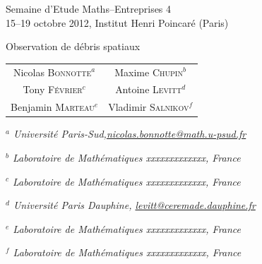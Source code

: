 \documentclass[a4paper,11pt]{article}
\numberwithin{section}{part}
\begin{document}
 \setcounter{page}{0}
 \thispagestyle{empty}
\begin{center}
\sffamily
 {\LARGE \sc Semaine d'Etude Maths--Entreprises 4} \\
\vfill
 {\large  15--19 octobre 2012, Institut Henri Poincaré (Paris)}
\end{center}
\vfill
\begin{center}
 \LARGE \textsf{Observation de débris spatiaux}
\end{center}
\vspace*{0.5cm}
\begin{center}
 \large \sffamily
\begin{tabular}{cc}
         Nicolas \textsc{Bonnotte$^{a}$} & Maxime \textsc{Chupin$^{b}$} \\
         Tony \textsc{Février$^{c}$} & Antoine \textsc{Levitt$^{d}$} \\ 
         Benjamin \textsc{Marteau$^{e}$} & Vladimir \textsc{Salnikov$^{f}$}
   \end{tabular}
\end{center}
\vfill
\centerline{\footnotesize\it $^{a}$ Université Paris-Sud,\url{nicolas.bonnotte@math.u-psud.fr}}
\centerline{\footnotesize\it $^{b}$ Laboratoire de Mathématiques xxxxxxxxxxxxx, France}
\centerline{\footnotesize\it $^{c}$ Laboratoire de Mathématiques xxxxxxxxxxxxx, France}
\centerline{\footnotesize\it $^{d}$ Université Paris Dauphine, \url{levitt@ceremade.dauphine.fr}}
\centerline{\footnotesize\it $^{e}$ Laboratoire de Mathématiques
  xxxxxxxxxxxxx, France}
\centerline{\footnotesize\it $^{f}$ Laboratoire de Mathématiques xxxxxxxxxxxxx, France}


\vfill
\end{document}
